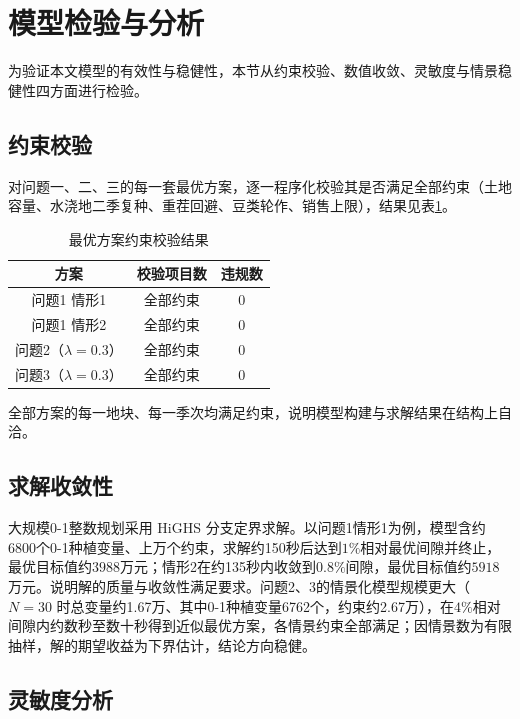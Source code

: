 \section{模型检验与分析}

为验证本文模型的有效性与稳健性，本节从约束校验、数值收敛、灵敏度与情景稳健性四方面进行检验。

\subsection{约束校验}

对问题一、二、三的每一套最优方案，逐一程序化校验其是否满足全部约束（土地容量、水浇地二季复种、重茬回避、豆类轮作、销售上限），结果见表\ref{tab:validate}。

\begin{table}[htbp]
	\caption{最优方案约束校验结果}
	\label{tab:validate}
	\centering
	\begin{tabular}{ccc}
		\toprule
		方案 & 校验项目数 & 违规数 \\
		\midrule
		问题1 情形1 & 全部约束 & 0 \\
		问题1 情形2 & 全部约束 & 0 \\
		问题2（$\lambda=0.3$） & 全部约束 & 0 \\
		问题3（$\lambda=0.3$） & 全部约束 & 0 \\
		\bottomrule
	\end{tabular}
\end{table}

全部方案的每一地块、每一季次均满足约束，说明模型构建与求解结果在结构上自洽。

\subsection{求解收敛性}

大规模0-1整数规划采用 HiGHS 分支定界求解。以问题1情形1为例，模型含约6800个0-1种植变量、上万个约束，求解约150秒后达到$1\%$相对最优间隙并终止，最优目标值约$3988$万元；情形2在约135秒内收敛到$0.8\%$间隙，最优目标值约$5918$万元。说明解的质量与收敛性满足要求。问题2、3的情景化模型规模更大（$N=30$ 时总变量约1.67万、其中0-1种植变量6762个，约束约2.67万），在$4\%$相对间隙内约数秒至数十秒得到近似最优方案，各情景约束全部满足；因情景数为有限抽样，解的期望收益为下界估计，结论方向稳健。

\subsection{灵敏度分析}

